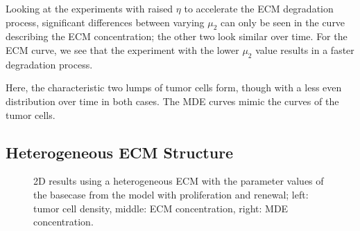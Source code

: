 Looking at the experiments with raised $\eta$ to accelerate the ECM degradation process, significant differences between varying $\mu_2$ can only be seen in the curve describing the ECM concentration; the other two look similar over time. For the ECM curve, we see that the experiment with the lower $\mu_2$ value results in a faster degradation process. 

Here, the characteristic two lumps of tumor cells form, though with a less even distribution over time in both cases. The MDE curves mimic the curves of the tumor cells.



\subsection{Heterogeneous ECM Structure}
\label{sec:2D_heterogenous_ECM}
\begin{figure}[h!]
 \centering
 \caption{2D results using a heterogeneous ECM with the parameter values of the basecase from the model with proliferation and renewal; left: tumor cell density, middle: ECM concentration, right: MDE concentration.}
 \label{fig:2D_heterogenous_ECM}
\end{figure}

